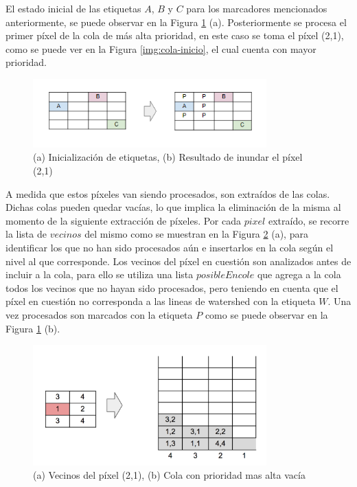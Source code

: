 El estado inicial de las  etiquetas $A$, $B$ y $C$ para los marcadores mencionados anteriormente, se puede observar en la Figura \ref{img:resultado-inicial} (a). Posteriormente se procesa el primer píxel de la cola de más alta prioridad, en este caso se toma el píxel (2,1), como se puede ver en la Figura \ref{img:cola-inicio}, el cual cuenta con mayor prioridad. 
\begin{figure}[h!]
\centering
\includegraphics[width=90mm]{./inundacion/resultado-inicial.png}
\caption{(a) Inicialización de etiquetas, (b) Resultado de inundar el píxel (2,1)}
\label{img:resultado-inicial}
\end{figure}
A medida que estos píxeles van siendo procesados, son extraídos de las colas. Dichas colas pueden quedar vacías, lo que implica la eliminación de la misma al momento de la siguiente extracción de píxeles. Por cada $pixel$ extraído, se recorre la lista de $vecinos$ del mismo como se muestran en la Figura \ref{img:cola-vacia} (a), para identificar los que no han sido procesados aún e insertarlos en la cola según el nivel al que corresponde. Los vecinos del píxel en cuestión son analizados antes de incluir a la cola, para ello se utiliza una lista $posibleEncole$ que agrega a la cola todos los vecinos que no hayan sido procesados, pero teniendo en cuenta que el píxel en cuestión no corresponda a las lineas de watershed con la etiqueta $W$. Una vez procesados son marcados con la etiqueta $P$ como se puede observar en la Figura \ref{img:resultado-inicial} (b).
\begin{figure}[h!]
\centering
\includegraphics[width=90mm]{./inundacion/cola-vacia.png}
\caption{(a) Vecinos del píxel (2,1), (b) Cola con prioridad mas alta vacía}
\label{img:cola-vacia}
\end{figure}

